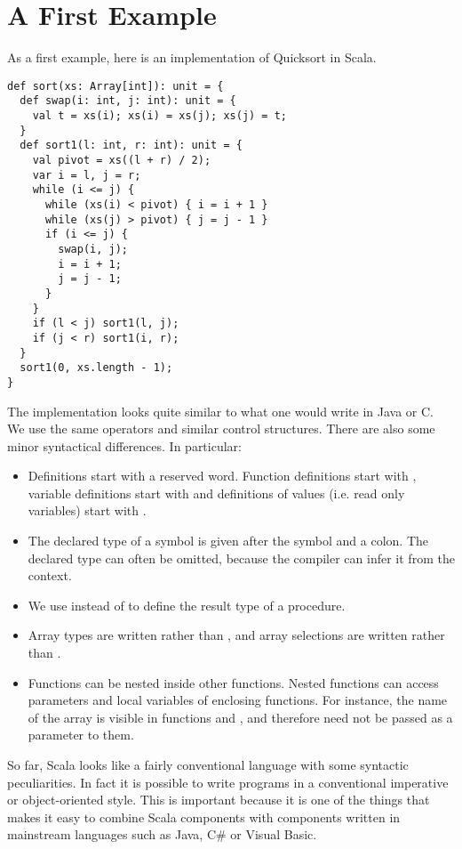 \def\exercise{
   \def\theresult{Exercise~\thesection.\arabic{result}}
   \refstepcounter{result}
   \trivlist\item[\hskip
   \labelsep{\bf \theresult}]}
\def\endexercise{\endtrivlist}
 
\newcommand{\rewriteby}[1]{\mbox{\tab\tab\rm(#1)}}

\chapter{\label{chap:example-one}A First Example}

As a first example, here is an implementation of Quicksort in Scala.

\begin{lstlisting}
def sort(xs: Array[int]): unit = {
  def swap(i: int, j: int): unit = {
    val t = xs(i); xs(i) = xs(j); xs(j) = t;
  }
  def sort1(l: int, r: int): unit = {
    val pivot = xs((l + r) / 2);
    var i = l, j = r;
    while (i <= j) {
      while (xs(i) < pivot) { i = i + 1 }
      while (xs(j) > pivot) { j = j - 1 }
      if (i <= j) { 
        swap(i, j);
        i = i + 1;
        j = j - 1;
      }
    } 
    if (l < j) sort1(l, j);
    if (j < r) sort1(i, r);
  }
  sort1(0, xs.length - 1);
}
\end{lstlisting}

The implementation looks quite similar to what one would write in Java
or C.  We use the same operators and similar control structures.
There are also some minor syntactical differences. In particular:
\begin{itemize}
\item
Definitions start with a reserved word. Function definitions start
with , variable definitions start with  and
definitions of values (i.e. read only variables) start with .
\item
The declared type of a symbol is given after the symbol and a colon.
The declared type can often be omitted, because the compiler can infer
it from the context.
\item
We use  instead of  to define the result type of
a procedure.
\item
Array types are written  rather than , 
and array selections are written  rather than .
\item
Functions can be nested inside other functions. Nested functions can
access parameters and local variables of enclosing functions. For
instance, the name of the array  is visible in functions
 and , and therefore need not be passed as a
parameter to them.
\end{itemize}
So far, Scala looks like a fairly conventional language with some
syntactic peculiarities. In fact it is possible to write programs in a
conventional imperative or object-oriented style. This is important
because it is one of the things that makes it easy to combine Scala
components with components written in mainstream languages such as
Java, C\# or Visual Basic.

